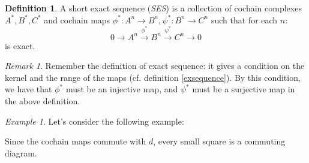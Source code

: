 \documentclass[a4paper,11pt,titlepage, article, oneside]{memoir}
\numberwithin{equation}{section}
\theoremstyle{definition}
\newtheorem{definition}[theorem]{Definition}
\theoremstyle{remark}
\newtheorem{remark}[theorem]{Remark}
\newtheorem{example}[theorem]{Example}
\begin{document}
\begin{definition}
  A short exact sequence (\textit{SES}) is a collection of cochain complexes $A^*, B^*, C^*$ and cochain maps $\phi^* \colon A^n \rightarrow B^n, \psi^* \colon B^n \rightarrow C^n$ such that for each $n$:
  \begin{equation}
    0 \longrightarrow A^n \overset{\phi^*}{\longrightarrow} B^n \overset{\psi^*}{\longrightarrow} C^n \longrightarrow 0
  \end{equation}
  is exact.
\end{definition}

\begin{remarkbox}\begin{remark}
  Remember the definition of exact sequence: it gives a condition on the kernel and the range of the maps (cf. definition \ref{exsequence}).
  By this condition, we have that $\phi^*$ must be an injective map, and $\psi^*$ must be a surjective map in the above definition.
\end{remark}\end{remarkbox}

\begin{tcolorbox}\begin{example}\label{seqexample}
  Let's consider the following example:\\
  \begin{center}
\end{center}
Since the cochain maps commute with $d$, every small square is a commuting diagram.
\end{example}\end{tcolorbox}
\end{document}

